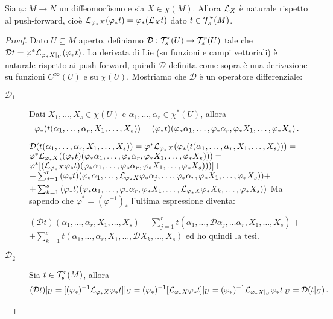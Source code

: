 \begin{proposition}
	Sia $\varphi: M \to N$ un diffeomorfismo e sia $X\in\chi(M)$. Allora $\mathcal L_X$ è naturale rispetto al push-forward, cioè $\mathcal L_{\varphi_*X} (\varphi_*t) = \varphi_*(\mathcal L_Xt)$ dato $t\in\mathcal T_s^r(M)$.
\end{proposition}
\begin{proof}
	Dato $U\subseteq M$ aperto, definiamo $\mathcal D: \mathcal T_s^r(U) \to \mathcal T_s^r(U)$ tale che $\mathcal Dt = \varphi^*\mathcal L_{\varphi_*X|_ U}(\varphi_*t)$.
	La derivata di Lie (su funzioni e campi vettoriali) è naturale rispetto ai push-forward, quindi $\mathcal D$ definita come sopra è una derivazione su funzioni $C^\infty(U)$ e su $\chi(U)$.
	Mostriamo che $\mathcal D$ è un operatore differenziale:
	\begin{description}
	 \item [$\mathcal D_1$]

	Dati $X_1,\ldots,X_s\in\chi(U)$ e $\alpha_1,\ldots,\alpha_r\in\chi^*(U)$, allora
	\begin{equation*}
	\varphi_*(t(\alpha_1,\ldots,\alpha_r,X_1,\ldots,X_s) )= (\varphi_*t)(\varphi_*\alpha_1,\ldots,\varphi_*\alpha_r,\varphi_*X_1,\ldots,\varphi_*X_s)\, \text{. }
	\end{equation*}
	
	  $  \mathcal D(t(\alpha_1,\ldots,\alpha_r,X_1,\ldots,X_s)) = \varphi^*\mathcal L_{\varphi_*X}(\varphi_*(t(\alpha_1,\ldots,\alpha_r,X_1,\ldots,X_s))) = $
	  $  \varphi^*\mathcal L_{\varphi_*X}((\varphi_*t)(\varphi_*\alpha_1,\ldots,\varphi_*\alpha_r,\varphi_*X_1,\ldots,\varphi_*X_s))) = $ \\
	  $  \varphi^*[(\mathcal L_{\varphi_*X}\varphi_*t)(\varphi_*\alpha_1,\ldots,\varphi_*\alpha_r,\varphi_*X_1,\ldots,\varphi_*X_s)))] + $ \\
	  $  +\sum_{j=1}^r{(\varphi_*t)(\varphi_*\alpha_1,\ldots,\mathcal L_{\varphi_*X}\varphi_*\alpha_j,\ldots,\varphi_*\alpha_r,\varphi_*X_1,\ldots,\varphi_*X_s))} +$ \\
	  $  +\sum_{k=1}^s{(\varphi_*t)(\varphi_*\alpha_1,\ldots,\varphi_*\alpha_r,\varphi_*X_1,\ldots,\mathcal L_{\varphi_*X}\varphi_*X_k,\ldots,\varphi_*X_s))} $
	Ma sapendo che $\varphi^*=(\varphi^{-1})_*$ l'ultima espressione diventa:
	
	  $ (\mathcal D t)(\alpha_1,\ldots,\alpha_r,X_1,\ldots,X_s)+\sum_{j=1}^r{t(\alpha_1,\ldots,\mathcal D \alpha_j, \ldots \alpha_r,X_1,\ldots,X_s)} +$\\
	  $ +\sum_{k=1}^s{t(\alpha_1,\ldots, \alpha_r,X_1,\ldots,\mathcal D X_k, \ldots,X_s)}$
	  ed ho quindi la tesi.
	
	\item [$\mathcal D_2$]
		Sia $t\in\mathcal T_s^r(M)$, allora
		\begin{equation*}
			(\mathcal Dt)|_ U = [(\varphi_*)^{-1} \mathcal L_{\varphi_*X}\varphi_*t]|_ U 
			= (\varphi_*)^{-1}[\mathcal L_{\varphi_*X}\varphi_*t]|_ U 
			= (\varphi_*)^{-1} \mathcal L_{\varphi_*X|_ U}\varphi_*t |_ U = \mathcal D(t|_ U) \, \text{. }
		\end{equation*}
	\end{description}
\end{proof}


